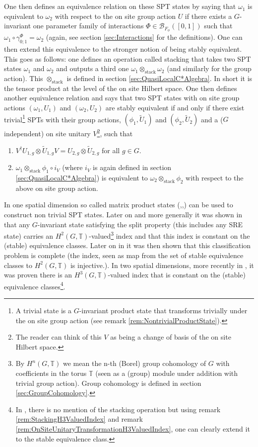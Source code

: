 \documentclass[12pt,a4paper,twoside]{article}
\newcommand{\BB}{\mathcal B}
\newcommand{\TT}{\mathbb T}
\theoremstyle{definition}
\numberwithin{equation}{section}
\begin{document}
\\\\
One then defines an equivalence relation on these SPT states by saying that $\omega_1$ is equivalent to $\omega_2$ with respect to the on site group action $U$ if there exists a $G$-invariant one parameter family of interactions $\Phi\in\BB_{F_\phi}([0,1])$ such that $\omega_1\circ\gamma^\Phi_{0;1}=\omega_2$ (again, see section \ref{sec:Interactions} for the definitions). One can then extend this equivalence to the stronger notion of being stably equivalent. This goes as follows: one defines an operation called stacking that takes two SPT states $\omega_1$ and $\omega_2$ and outputs a third one $\omega_1\otimes_{\text{stack}}\omega_2$ (and similarly for the group action). This $\otimes_\text{stack}$ is defined in section \ref{sec:QuasiLocalC*Algebra}. In short it is the tensor product at the level of the on site Hilbert space. One then defines another equivalence relation and says that two SPT states with on site group actions $(\omega_1,U_1)$ and $(\omega_2,U_2)$ are stably equivalent if and only if there exist trivial\footnote{A trivial state is a $G$-invariant product state that transforms trivially under the on site group action (see remark \ref{rem:NontrivialProductState}).} SPTs with their group actions, $(\phi_1,\tilde{U}_1)$ and $(\phi_2,\tilde{U}_2)$ and a ($G$ independent) on site unitary $V$\footnote{The reader can think of this $V$ as being a change of basis of the on site Hilbert space.}, such that
\begin{enumerate}
	\item $V^\dagger U_{1,g}\otimes \tilde{U}_{1,g}V=U_{2,g}\otimes \tilde{U}_{2,g}$ for all $g\in G$.
	\item $\omega_1\otimes_{\text{stack}}\phi_1\circ i_V$ (where $i_V$ is again defined in section \ref{sec:QuasiLocalC*Algebra}) is equivalent to $\omega_2\otimes_{\text{stack}}\phi_2$ with respect to the above on site group action.
\end{enumerate}
In one spatial dimension so called matrix product states (\cite{Chen_2011},\cite{pollman2012symmetry},\cite{schuch2011MatrixProduct}) can be used to construct non trivial SPT states. Later on and more generally it was shown in \cite{ogata2019classification} that any $G$-invariant state satisfying the split property (this includes any SRE state) carries an $H^2(G,\TT)$-valued\footnote{By $H^n(G,\TT)$ we mean the n-th (Borel) group cohomology of $G$ with coefficients in the torus $\TT$ (seen as a (group) module under addition with trivial group action). Group cohomology is defined in section \ref{sec:GroupCohomology}.} index and that this index is constant on the (stable) equivalence classes. Later on in \cite{kapustin2021classification} it was then shown that this classification problem is complete (the index, seen as map from the set of stable equivalence classes to $H^2(G,\TT)$ is injective.). In two spatial dimensions, more recently in \cite{ogata2021h3gmathbb}, it was proven there is an $H^3(G,\TT)$-valued index that is constant on the (stable) equivalence classes\footnote{In \cite{ogata2021h3gmathbb}, there is no mention of the stacking operation but using remark \ref{rem:StackingH3ValuedIndex} and remark \ref{rem:OnSiteUnitaryTransformationH3ValuedIndex}, one can clearly extend it to the stable equivalence class.}.
\end{document}
